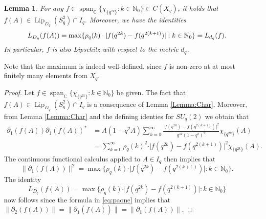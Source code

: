 \documentclass[11pt, reqno, a4paper, final]{amsart}
\theoremstyle{plain}
\newtheorem{lemma}[thm]{Lemma}
\theoremstyle{definition}
\newcommand{\NN}{{\mathbb N}}
\newcommand{\CC}{{\mathbb C}}
\newcommand{\Lip}{\operatorname{Lip}}
\newcommand{\black}{\color{black}}
\begin{document}
\begin{lemma}
\label{Lemma:Linearcomb}
For any $f\in \operatorname{span}_\CC\{\chi_{\lbrace q^{2k}\rbrace} : k\in \NN_0\} \subset C(X_q)$, it holds that $f(A) \in \Lip_{D_q}(S_q^2) \cap I_q$. Moreover, we have the {\black identities}
\[
L_{D_q}(f(A))= \max\lbrace \rho_q(k) \cdot \vert f(q^{2k})-f(q^{2(k+1)}) \vert : {\black  k \in \NN_0} \rbrace = L_{d_q}(f).
\]
In particular, $f$ is also Lipschitz with respect to the metric $d_q$.
\end{lemma}
Note that the maximum is indeed {\black well-defined}, since $f$ is non-zero at at most finitely many elements from $X_q$.
\begin{proof}
{\black Let $f\in \operatorname{span}_\CC\{\chi_{\lbrace q^{2k}\rbrace} : k\in \NN_0\}$ be given. The fact that $f(A) \in \Lip_{D_q}(S_q^2) \cap I_q$ is a consequence of Lemma \ref{Lemma:Char}. Moreover, from Lemma \ref{Lemma:Char} and the defining identies for $SU_q(2)$ we obtain that
\[
\begin{split}
\partial_1( f(A))\partial_1(f(A))^*
& = A(1-q^2A) \sum_{k = 0}^\infty \frac{\vert f(q^{2k}) - f(q^{2(k+1)}) \vert^2}{ q^{4k}(1 - q^2)^2} \chi_{\lbrace q^{2k}\rbrace}(A) \\
& = \sum_{k = 0}^\infty \rho_q(k)^2 \cdot \vert f(q^{2k}) - f(q^{2(k+1)}) \vert^2 \chi_{\lbrace q^{2k}\rbrace}(A) .
\end{split}
\]
The continuous functional calculus applied to $A \in I_q$ then implies that
\begin{equation}\label{eq:paone}
\big\| \partial_1(f(A)) \big\|^2
= \max\lbrace \rho_q(k) \cdot \vert f(q^{2k})-f(q^{2(k+1)}) \vert : k \in \NN_0 \rbrace .
\end{equation}
The identity
\[
L_{D_q}(f(A)) = \max\lbrace \rho_q(k) \cdot \vert f(q^{2k})-f(q^{2(k+1)}) \vert : k \in \NN_0 \rbrace
\]
now follows since the formula in \eqref{eq:paone} implies that $\| \partial_2(f(A)) \| = \| \partial_1(\overline{f}(A)) \| = \| \partial_1(f(A)) \|$.} 


\end{proof}
\end{document}
